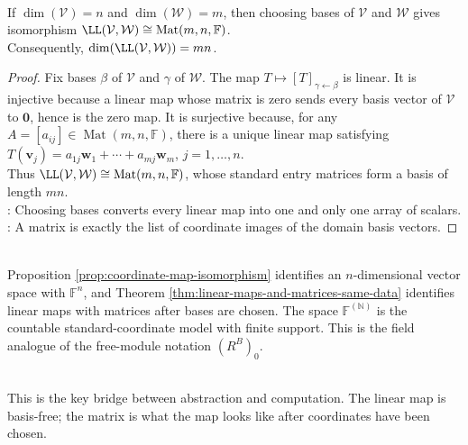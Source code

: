 \begin{theorem} \label{thm:linear-maps-and-matrices-same-data} \\
If $\dim(\mathcal{V}) = n$ and $\dim(\mathcal{W}) = m$, then choosing bases of $\mathcal{V}$ and $\mathcal{W}$ gives isomorphism $\LL(\mathcal{V}, \mathcal{W}) \cong \operatorname{Mat}(m,n,\mathbb{F})$.\\
Consequently, $\dim(\LL(\mathcal{V}, \mathcal{W})) = mn$.
\begin{proof}
Fix bases $\beta$ of $\mathcal{V}$ and $\gamma$ of $\mathcal{W}$. The map $T\mapsto [T]_{\gamma \leftarrow \beta}$ is linear. It is injective because a linear map whose matrix is zero sends every basis vector of $\mathcal{V}$ to $\mathbf{0}$, hence is the zero map. It is surjective because, for any $A=[a_{ij}]\in\operatorname{Mat}(m,n,\mathbb{F})$, there is a unique linear map satisfying $T(\mathbf{v}_j)=a_{1j}\mathbf{w}_1+\cdots+a_{mj}\mathbf{w}_m$, $j=1,\ldots,n$.\\
Thus $\LL(\mathcal{V},\mathcal{W})\cong\operatorname{Mat}(m,n,\mathbb{F})$, whose standard entry matrices form a basis of length $mn$.\\
: Choosing bases converts every linear map into one and only one array of scalars.\\
: A matrix is exactly the list of coordinate images of the domain basis vectors.
\end{proof}
\end{theorem}

\begin{perspective} \label{per:finite-support-coordinate-model} \\
Proposition \ref{prop:coordinate-map-isomorphism} identifies an $n$-dimensional vector space with $\mathbb{F}^n$, and Theorem \ref{thm:linear-maps-and-matrices-same-data} identifies linear maps with matrices after bases are chosen. The space $\mathbb{F}^{(\mathbb{N})}$ is the countable standard-coordinate model with finite support. This is the field analogue of the free-module notation $(R^B)_0$.
\end{perspective}

\begin{motivation} \\
This is the key bridge between abstraction and computation. The linear map is basis-free; the matrix is what the map looks like after coordinates have been chosen.
\end{motivation}
